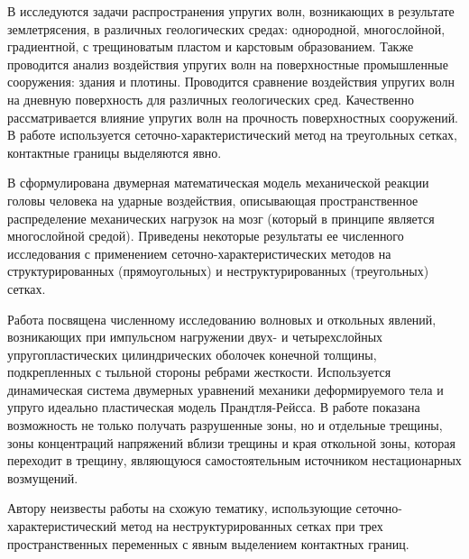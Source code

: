 В \cite{golubev_kvasov_petrov} исследуются задачи распространения упругих волн, возникающих в результате землетрясения, в различных геологических средах: однородной, многослойной, градиентной, с трещиноватым пластом и карстовым образованием. Также проводится анализ воздействия упругих волн на поверхностные промышленные сооружения: здания и плотины. Проводится сравнение воздействия упругих волн на дневную поверхность для различных геологических сред. Качественно рассматривается влияние упругих волн на прочность поверхностных сооружений. В работе используется сеточно-характеристический метод на треугольных сетках, контактные границы выделяются явно.

В \cite{agapov_belocerkovsky_petrov} сформулирована двумерная математическая модель механической реакции головы человека на ударные воздействия, описывающая пространственное распределение механических нагрузок на мозг (который в принципе является многослойной средой). Приведены некоторые результаты ее численного исследования с применением сеточно-характеристических методов на структурированных (прямоугольных) и неструктурированных (треугольных) сетках.

Работа \cite{petrov} посвящена численному исследованию волновых и откольных явлений, возникающих при импульсном нагружении двух- и четырехслойных упругопластических цилиндрических оболочек конечной толщины, подкрепленных с тыльной стороны ребрами жесткости. Используется динамическая система двумерных уравнений механики деформируемого тела и упруго идеально пластическая модель Прандтля-Рейсса. В работе показана возможность не только получать разрушенные зоны, но и отдельные трещины, зоны концентраций напряжений вблизи трещины и края откольной зоны, которая переходит в трещину, являющуюся самостоятельным источником нестационарных возмущений.

Автору неизвесты работы на схожую тематику, использующие сеточно-характеристический метод на неструктурированных сетках при трех пространственных переменных с явным выделением контактных границ.

